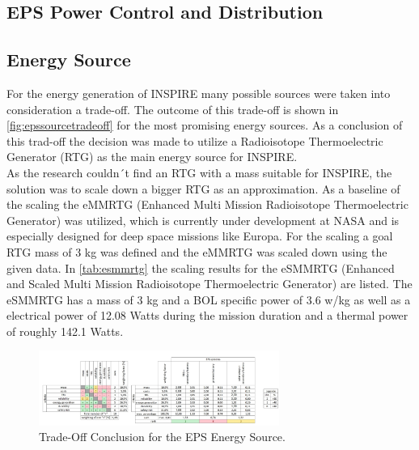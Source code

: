\subsection{EPS Power Control and Distribution}

\subsection{Energy Source}
For the energy generation of INSPIRE many possible sources were taken into consideration a trade-off. The outcome of this trade-off is shown in \autoref{fig:epssourcetradeoff} for the most promising energy sources. As a conclusion of this trad-off the decision was made to utilize a Radioisotope Thermoelectric Generator (RTG) as the main energy source for INSPIRE. \\

As the research couldn´t find an RTG with a mass suitable for INSPIRE, the solution was to scale down a bigger RTG as an approximation. As a baseline of the scaling the eMMRTG (Enhanced Multi Mission Radioisotope Thermoelectric Generator) was utilized, which is currently under development at NASA and is especially designed for deep space missions like Europa. For the scaling a goal RTG mass of 3 kg was defined and the eMMRTG was scaled down using the given data.
In \autoref{tab:esmmrtg} the scaling results for the eSMMRTG (Enhanced and Scaled Multi Mission Radioisotope Thermoelectric Generator) are listed. The eSMMRTG has a mass of 3 kg and a BOL specific power of 3.6 w/kg as well as a electrical power of 12.08 Watts during the mission duration and a thermal power of roughly 142.1 Watts.



\begin{figure}[htb]
{\centering
\includegraphics[width=0.7\textwidth]{Media/epssourcetradeoff}
\caption{Trade-Off Conclusion for the EPS Energy Source.}
\label{fig:epssourcetradeoff}
}
\end{figure}

